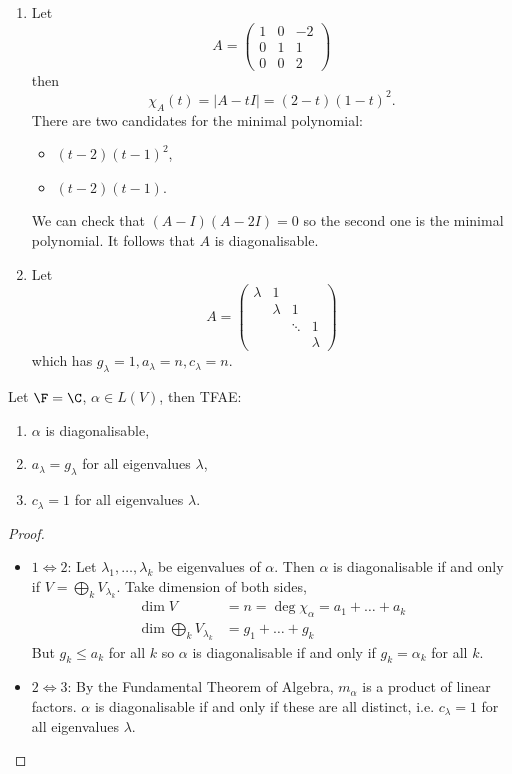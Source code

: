 \documentclass[a4paper]{article}
\theoremstyle{definition}
\begin{document}
\begin{eg}\leavevmode
  \begin{enumerate}
  \item Let
  \[
    A =
    \begin{pmatrix}
      1 & 0 & -2 \\
      0 & 1 & 1 \\
      0 & 0 & 2
    \end{pmatrix}
  \]
  then
  \[
    \chi_A(t) = |A - tI| = (2 - t)(1 - t)^2.
  \]
  There are two candidates for the minimal polynomial:
  \begin{itemize}
  \item \((t - 2)(t - 1)^2\),
  \item \((t - 2)(t - 1)\).
  \end{itemize}
  We can check that \((A - I)(A - 2I) = 0\) so the second one is the minimal polynomial. It follows that \(A\) is diagonalisable.
\item Let
  \[
    A =
    \begin{pmatrix}
      \lambda & 1 & & \\
      & \lambda & 1 &  \\
      & & \ddots & 1 \\
      & & & \lambda
    \end{pmatrix}
  \]
  which has \(g_\lambda = 1, a_\lambda = n, c_\lambda = n\).
  \end{enumerate}
\end{eg}

\begin{lemma}
  Let \(\F = \C\), \(\alpha \in L(V)\), then TFAE:
  \begin{enumerate}
  \item \(\alpha\) is diagonalisable,
  \item \(a_\lambda = g_\lambda\) for all eigenvalues \(\lambda\),
  \item \(c_\lambda = 1\) for all eigenvalues \(\lambda\).
  \end{enumerate}
\end{lemma}

\begin{proof}\leavevmode
  \begin{itemize}
  \item \(1 \Leftrightarrow 2\): Let \(\lambda_1, \dots, \lambda_k\) be eigenvalues of \(\alpha\). Then \(\alpha\) is diagonalisable if and only if \(V = \bigoplus_k V_{\lambda_k}\). Take dimension of both sides,
    \begin{align*}
      \dim V &= n = \deg \chi_\alpha = a_1 + \dots + a_k \\
      \dim \bigoplus_k V_{\lambda_k} &= g_1 + \dots + g_k
    \end{align*}
    But \(g_k \leq a_k\) for all \(k\) so \(\alpha\) is diagonalisable if and only if \(g_k = \alpha_k\) for all \(k\).
  \item \(2 \Leftrightarrow 3\): By the Fundamental Theorem of Algebra, \(m_\alpha\) is a product of linear factors. \(\alpha\) is diagonalisable if and only if these are all distinct, i.e. \(c_\lambda = 1\) for all eigenvalues \(\lambda\).
  \end{itemize}
\end{proof}
\end{document}
